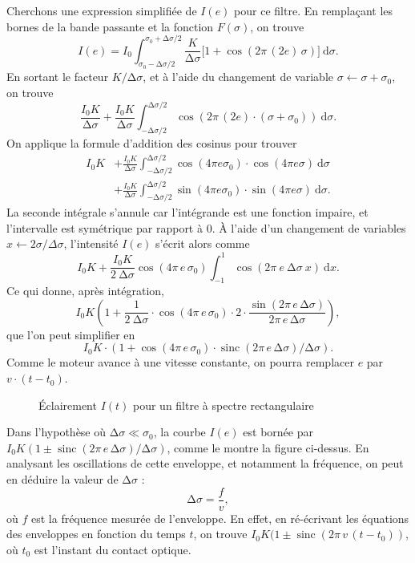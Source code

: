 \documentclass[a4paper,twocolumn,10pt,margin=0.5in]{extreport}
\begin{document}
	Cherchons une expression simplifiée de $I(e)$ pour ce filtre. En remplaçant les bornes de la bande passante et la fonction $F(\sigma)$, on trouve \[
		I(e) = I_0 \int_{\sigma_0 - \mathrm{\Delta}\sigma / 2}^{\sigma_0 + \mathrm{\Delta}\sigma / 2} \frac{K}{\mathrm{\Delta}\sigma}\big[1+\cos(2\pi\,(2e)\,\sigma)\big]~\mathrm{d}\sigma
	.\]
	En sortant le facteur $K / \mathrm{\Delta}\sigma$, et à l'aide du changement de variable $\sigma \gets \sigma + \sigma_0$, on trouve 
	\[
		\frac{I_0K}{\mathrm{\Delta}\sigma} + \frac{I_0K}{\mathrm{\Delta}\sigma}  \int_{-\mathrm{\Delta}\sigma / 2}^{\mathrm{\Delta} \sigma / 2} \cos(2\pi\,(2e) \cdot (\sigma + \sigma_0))~\mathrm{d}\sigma 
	.\]
	On applique la formule d'addition des cosinus pour trouver
	\begin{align*}
		I_0 K &+
		\frac{I_0 K}{\mathrm{\Delta}\sigma}
		\int_{-\mathrm{\Delta}\sigma/2}^{\mathrm{\Delta}\sigma / 2} \cos(4\pi e \sigma_0) \cdot \cos(4\pi e \sigma)~\mathrm{d}\sigma\\
		&+
		\frac{I_0 K}{\mathrm{\Delta}\sigma}
		\int_{-\mathrm{\Delta}\sigma/2}^{\mathrm{\Delta}\sigma / 2} \sin(4\pi e \sigma_0) \cdot \sin(4\pi e \sigma)~\mathrm{d}\sigma.
	\end{align*}
	La seconde intégrale s'annule car l'intégrande est une fonction impaire, et l'intervalle est symétrique par rapport à 0.
	À l'aide d'un changement de variables $x \gets 2\sigma / \Delta\sigma$, l'intensité $I(e)$ s'écrit alors comme \[
		I_0K +
		\frac{I_0K}{\mathrm{2\:\Delta}\sigma} \cos(4\pi\,e\,\sigma_0) \int_{-1}^{1} \cos(2\pi\:e\:\mathrm{\Delta}\sigma \:x) ~\mathrm{d}x 
	.\]
	Ce qui donne, après intégration, \[
		I_0K \left( 1+ \frac{1}{2\:\mathrm{\Delta}\sigma} \cdot\cos(4\pi\,e\,\sigma_0) \cdot 2 \cdot \frac{\sin(2\pi \,e\, \mathrm{\Delta}\sigma)}{2\pi\,e\,\mathrm{\Delta}\sigma} \right) 
	,\] que l'on peut simplifier en \[
		I_0K\cdot \left( 1 + \cos(4\pi\,e\,\sigma_0) \cdot \operatorname{sinc}(2\pi\,e\,\mathrm{\Delta}\sigma) / \mathrm{\Delta}\sigma \right)
	.\]Comme le moteur avance à une vitesse constante, on pourra remplacer $e$ par $v\cdot (t - t_0)$.

	\begin{figure}[H]
		\centering
		\resizebox{\linewidth}{!}{}
		\caption{Éclairement $I(t)$ pour un filtre à spectre rectangulaire}
	\end{figure}

	Dans l'hypothèse où $\mathrm{\Delta}\sigma \ll \sigma_0$, la courbe $I(e)$ est bornée par $I_0 K(1 \pm \operatorname{sinc}(2\pi\,e\,\mathrm{\Delta}\sigma) / \mathrm{\Delta}\sigma)$, comme le montre la figure ci-dessus.
	En analysant les oscillations de cette enveloppe, et notamment la fréquence, on peut en déduire la valeur de $\mathrm{\Delta}\sigma$ : \[
		\mathrm{\Delta}\sigma = \frac{f}{v}
	,\] où $f$ est la fréquence mesurée de l'enveloppe. En effet, en ré-écrivant les équations des enveloppes en fonction du temps $t$, on trouve $I_0K (1 \pm \operatorname{sinc}(2\pi\,v\,(t-t_0))$, où $t_0$ est l'instant du contact optique.
\end{document}
